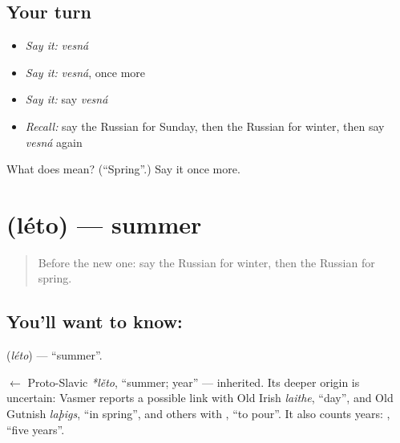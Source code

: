 \subsection*{Your turn}
\begin{itemize}
\raggedright
  \item \emph{Say it:} \emph{vesná}
  \item \emph{Say it:} \emph{vesná}, once more
  \item \emph{Say it:} say \emph{vesná}
  \item \emph{Recall:} say the Russian for Sunday, then the Russian for winter, then say \emph{vesná} again
\end{itemize}

\begin{tcolorbox}[breakable,colback=teal!4,colframe=teal!35!black,title={Before you move on}]
What does  mean? (\textquotedblleft{}Spring\textquotedblright{}.) Say it once more.
\end{tcolorbox}
\section[\texorpdfstring{\ru{лето} (léto)}{лето (léto)}]{ (léto) — summer}

\label{lesson:RU-C71-summer}



\begin{quote}
Before the new one: say the Russian for winter, then the Russian for spring.
\end{quote}

\subsection*{You'll want to know: }
\textbf{} (\emph{léto}) — \textquotedblleft{}summer\textquotedblright{}.

\begin{cousinweb}
\textbf{} $\leftarrow$ Proto-Slavic \emph{*lěto}, \textquotedblleft{}summer; year\textquotedblright{} — inherited. Its deeper origin is uncertain: Vasmer reports a possible link with Old Irish \emph{laithe}, \textquotedblleft{}day\textquotedblright{}, and Old Gutnish \emph{laþigs}, \textquotedblleft{}in spring\textquotedblright{}, and others with \emph{}, \textquotedblleft{}to pour\textquotedblright{}. It also counts years: \emph{ }, \textquotedblleft{}five years\textquotedblright{}.
\end{cousinweb}

